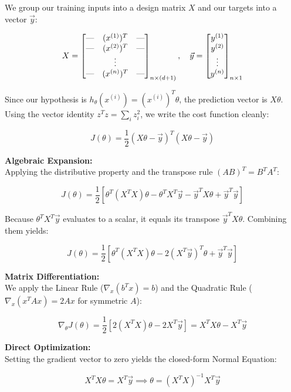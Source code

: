 \documentclass[12pt, a4paper]{report}
\begin{document}
We group our training inputs into a design matrix $X$ and our targets into a vector $\vec{y}$:

\[
X = \begin{bmatrix} \text{\textemdash} & (x^{(1)})^T & \text{\textemdash} \\ \text{\textemdash} & (x^{(2)})^T & \text{\textemdash} \\ & \vdots & \\ \text{\textemdash} & (x^{(n)})^T & \text{\textemdash} \end{bmatrix}_{n \times (d+1)} , \quad \vec{y} = \begin{bmatrix} y^{(1)} \\ y^{(2)} \\ \vdots \\ y^{(n)} \end{bmatrix}_{n \times 1}
\]

Since our hypothesis is $h_\theta(x^{(i)}) = (x^{(i)})^T \theta$, the prediction vector is $X\theta$. Using the vector identity $z^T z = \sum_{i} z_i^2$, we write the cost function cleanly:

\[ J(\theta) = \frac{1}{2} (X\theta - \vec{y})^T (X\theta - \vec{y}) \]

\textbf{Algebraic Expansion:}\\
Applying the distributive property and the transpose rule $(AB)^T = B^T A^T$:

\[ J(\theta) = \frac{1}{2} \left[ \theta^T (X^T X) \theta - \theta^T X^T \vec{y} - \vec{y}^T X \theta + \vec{y}^T \vec{y} \right] \]

Because $\theta^T X^T \vec{y}$ evaluates to a scalar, it equals its transpose $\vec{y}^T X \theta$. Combining them yields:

\[ J(\theta) = \frac{1}{2} \left[ \theta^T (X^T X) \theta - 2(X^T \vec{y})^T \theta + \vec{y}^T \vec{y} \right] \]

\textbf{Matrix Differentiation:}\\
We apply the Linear Rule ($\nabla_x (b^T x) = b$) and the Quadratic Rule ($\nabla_x (x^T A x) = 2Ax$ for symmetric $A$):

\[ \nabla_\theta J(\theta) = \frac{1}{2} \left[ 2(X^T X)\theta - 2X^T \vec{y} \right] = X^T X \theta - X^T \vec{y} \]

\textbf{Direct Optimization:}\\
Setting the gradient vector to zero yields the closed-form Normal Equation:

\[ X^T X \theta = X^T \vec{y} \implies \boxed{\theta = (X^T X)^{-1} X^T \vec{y}} \]
\end{document}
